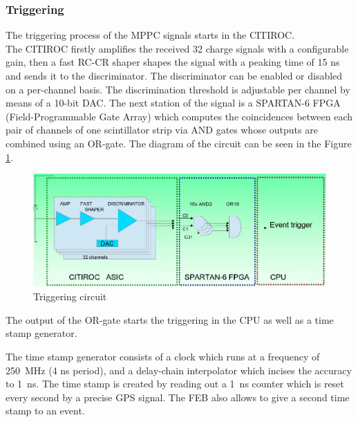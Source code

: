\documentclass[a4paper]{article}\linespread{1.4}
\begin{document}
\subsubsection{Triggering}
The triggering process of the MPPC signals starts in the CITIROC. 
\\The CITIROC firstly amplifies the received 32 charge signals with a configurable gain, then a fast RC-CR shaper shapes the signal with a peaking time of 15 ns and sends it to the discriminator. The discriminator can be enabled or disabled on a per-channel basis. The discrimination threshold is adjustable per channel by means of a 10-bit DAC. The next station of the signal is a SPARTAN-6 FPGA (Field-Programmable Gate Array) which computes the coincidences between each pair of channels of one scintillator strip via AND gates whose outputs are combined using an OR-gate. The diagram of the circuit can be seen in the Figure \ref{fig:trig}. \begin{figure}[h!] \centering \includegraphics[width=120mm,scale=1.0]{trig.png} \caption{Triggering circuit \cite{E}} \label{fig:trig} \end{figure}
The output of the OR-gate starts the triggering in the CPU as well as a time stamp generator. 

The time stamp generator consists of a clock which runs at a frequency of 250~MHz (4 ns period), and a delay-chain interpolator which incises the accuracy to 1~ns. The time stamp is created by reading out a 1~ns counter which is reset every second by a precise GPS signal. The FEB also allows to give a second time stamp to an event. 
\end{document}
